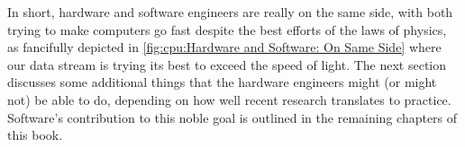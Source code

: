 In short, hardware and software engineers are really on the same side,
with both trying to make computers go fast despite the best efforts of
the laws of physics, as fancifully depicted in
\cref{fig:cpu:Hardware and Software: On Same Side}
where our data stream is trying its best to exceed the speed of light.
The next section discusses some additional things that the hardware engineers
might (or might not) be able to do, depending on how well recent
research translates to practice.
Software's contribution to this noble goal is outlined in the remaining
chapters of this book.
